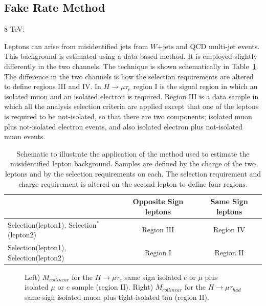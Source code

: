 \subsection{Fake Rate Method}
8 TeV:


Leptons can arise from misidentified jets  from $W\mathrm{+jets}$ and QCD multi-jet events. This background is estimated using a data based method.
It is employed slightly differently in the
two channels. The technique is shown schematically in Table~\ref{tab:fakeratediagram}.
The difference in the two channels is how the selection requirements are altered to define regions III and IV.
In $H \rightarrow \mu \tau_{e}$ region I is the signal region in which an isolated muon and an isolated electron is required.
Region III is a data sample in which all the analysis selection criteria are applied except that
one of the leptons is required to be not-isolated, so that there are two components;  isolated muon plus not-isolated
electron events, and also isolated electron plus not-isolated muon events.

\begin{table}[hbtp]
 \begin{center}
 \caption{Schematic to illustrate the application of the method used to estimate the misidentified lepton background. Samples
are defined by the charge of the two leptons and by the selection requirements on each. The selection requirement and charge requirement
is altered on the second lepton to define four regions.}
  \label{tab:fakeratediagram}
  \vspace{0.1in}
  \begin{tabular}{|l|c|c|} \hline
                                                   & Opposite Sign leptons &  Same Sign leptons     \\ \hline
Selection(lepton1), Selection$^{*}$(lepton2)          & Region III            &  Region IV             \\ \hline
Selection(lepton1), Selection(lepton2)              & Region I              &  Region II             \\ \hline
  \end{tabular}
 \end{center}
\end{table}



\begin{figure}[hbtp]\begin{center}
\caption{Left)  $M_{collinear}$ for the $H \rightarrow \mu \tau_{e}$ same sign isolated $e$ or $\mu$ plus isolated $\mu$ or $e$ sample (region II).
         Right) $M_{collinear}$ for the $H \rightarrow \mu \tau_{had}$ same sign isolated muon plus tight-isolated tau (region II). }
\label{fig:samesign_fakes}\end{center}\end{figure}


